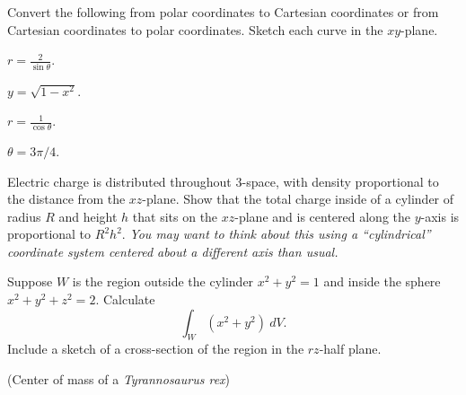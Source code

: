 \documentclass[12pt,letterpaper,noanswers]{exam}
\begin{document}
\begin{questions}
\begin{parts}
\end{parts}




\item Convert the following from polar coordinates to Cartesian coordinates or from Cartesian coordinates to polar coordinates.  Sketch each curve in the $xy$-plane.
\begin{parts}
\item $r=\frac{2}{\sin\theta}$.

\item $y=\sqrt{1-x^2}$.

\item $r=\frac{1}{\cos\theta}$.

\item $\theta = 3\pi/4$.

\end{parts}


\item Electric charge is distributed throughout $3$-space, with density proportional to the distance from the $xz$-plane.  Show that the total charge inside of a cylinder of radius $R$ and height $h$ that sits on the $xz$-plane and is centered along the $y$-axis is proportional to $R^2h^2$.  \emph{You may want to think about this using a ``cylindrical'' coordinate system centered about a different axis than usual.}

\question Suppose $W$ is the region outside the cylinder $x^2+y^2 = 1$ and inside the sphere $x^2+y^2+z^2 = 2$.  Calculate \[\int_W (x^2+y^2)\ dV.\]  Include a sketch of a cross-section of the region in the $rz$-half plane.

\question (Center of mass of a \emph{Tyrannosaurus rex})


\end{questions}
\end{document}
